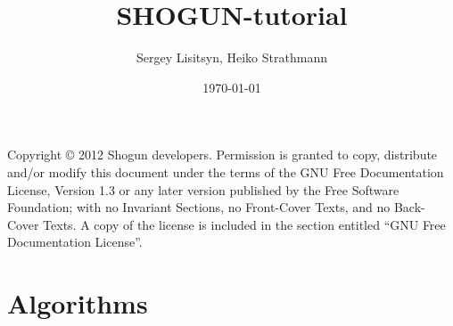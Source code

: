 \documentclass{shogun_tutorial}
\title{SHOGUN-tutorial}
\date{\today}
\author{Sergey Lisitsyn, Heiko Strathmann}
\begin{document}
	\maketitle
	Copyright \copyright{}  2012 Shogun developers.
    Permission is granted to copy, distribute and/or modify this document
    under the terms of the GNU Free Documentation License, Version 1.3
    or any later version published by the Free Software Foundation;
    with no Invariant Sections, no Front-Cover Texts, and no Back-Cover Texts.
    A copy of the license is included in the section entitled ``GNU
    Free Documentation License''.
    
    
	\tableofcontents
	\listoftodos
	\part{Algorithms}
	
	
	
	
	\begin{appendix}
	
	\end{appendix}
	
	
	 
\end{document}
